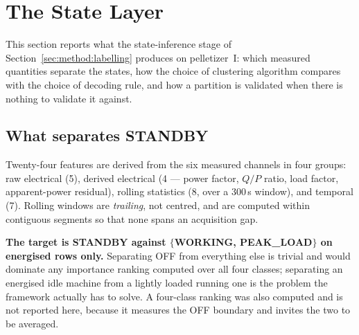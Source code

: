 %
%
%

\section{The State Layer}
\label{sec:states}
\label{sec:results}

This section reports what the state-inference stage of
Section~\ref{sec:method:labelling} produces on pelletizer~I: which
measured quantities separate the states, how the choice of clustering
algorithm compares with the choice of decoding rule, and how a partition
is validated when there is nothing to validate it against.

\subsection{What separates STANDBY}
\label{sec:states:features}

Twenty-four features are derived from the six measured channels in four
groups: raw electrical (5), derived electrical (4 --- power factor,
$Q/P$ ratio, load factor, apparent-power residual), rolling statistics
(8, over a $300$\,s window), and temporal (7). Rolling windows are
\emph{trailing}, not centred, and are computed within contiguous
segments so that none spans an acquisition gap.

\textbf{The target is STANDBY against $\{$WORKING, PEAK\_LOAD$\}$ on
energised rows only.} Separating OFF from everything else is trivial and
would dominate any importance ranking computed over all four classes;
separating an energised idle machine from a lightly loaded running one
is the problem the framework actually has to solve. A four-class
ranking was also computed and is not reported here, because it measures
the OFF boundary and invites the two to be averaged.

